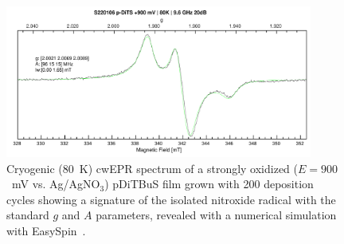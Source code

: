 \begin{figure}[]
\center
	\includegraphics[width=0.9\textwidth]{./operando_epr/figures/CRYO/S220106_p-DiTS_OX_80K_CW_SIM.pdf}
	\caption{Cryogenic (80~K) cwEPR spectrum of a strongly oxidized ($E=900$~mV vs. Ag/AgNO$_3$) pDiTBuS film grown with 200 deposition cycles showing a signature of the isolated nitroxide radical with the standard $g$ and $A$ parameters, revealed with a numerical simulation with EasySpin~\cite{Stoll2006}.}
	\label{fig:cwEPR_CRYO_DiTBuS_CHG_SIM}
\end{figure}
